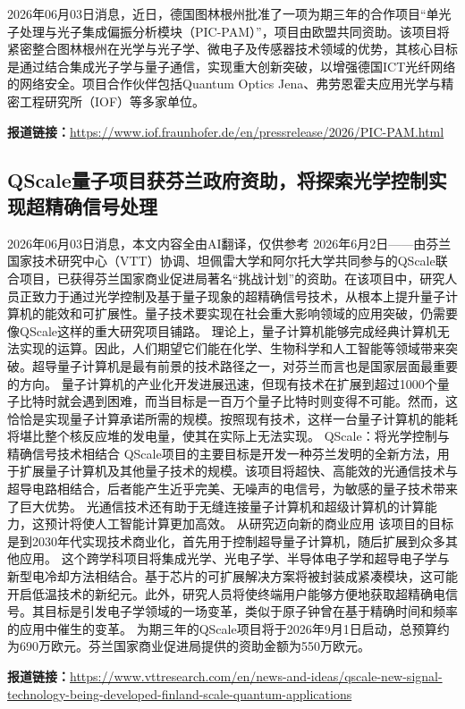 \documentclass[12pt,a4paper]{ctexart}
\begin{document}
2026年06月03日消息，近日，德国图林根州批准了一项为期三年的合作项目“单光子处理与光子集成偏振分析模块（PIC-PAM）”，项目由欧盟共同资助。该项目将紧密整合图林根州在光学与光子学、微电子及传感器技术领域的优势，其核心目标是通过结合集成光子学与量子通信，实现重大创新突破，以增强德国ICT光纤网络的网络安全。项目合作伙伴包括Quantum Optics Jena、弗劳恩霍夫应用光学与精密工程研究所（IOF）等多家单位。

\noindent\textbf{报道链接：}\url{https://www.iof.fraunhofer.de/en/pressrelease/2026/PIC-PAM.html}

\subsection{ QScale量子项目获芬兰政府资助，将探索光学控制实现超精确信号处理 }

2026年06月03日消息，本文内容全由AI翻译，仅供参考
2026年6月2日——由芬兰国家技术研究中心（VTT）协调、坦佩雷大学和阿尔托大学共同参与的QScale联合项目，已获得芬兰国家商业促进局著名“挑战计划”的资助。在该项目中，研究人员正致力于通过光学控制及基于量子现象的超精确信号技术，从根本上提升量子计算机的能效和可扩展性。量子技术要实现在社会重大影响领域的应用突破，仍需要像QScale这样的重大研究项目铺路。
理论上，量子计算机能够完成经典计算机无法实现的运算。因此，人们期望它们能在化学、生物科学和人工智能等领域带来突破。超导量子计算机是最有前景的技术路径之一，对芬兰而言也是国家层面最重要的方向。
量子计算机的产业化开发进展迅速，但现有技术在扩展到超过1000个量子比特时就会遇到困难，而当目标是一百万个量子比特时则变得不可能。然而，这恰恰是实现量子计算承诺所需的规模。按照现有技术，这样一台量子计算机的能耗将堪比整个核反应堆的发电量，使其在实际上无法实现。
QScale：将光学控制与精确信号技术相结合
QScale项目的主要目标是开发一种芬兰发明的全新方法，用于扩展量子计算机及其他量子技术的规模。该项目将超快、高能效的光通信技术与超导电路相结合，后者能产生近乎完美、无噪声的电信号，为敏感的量子技术带来了巨大优势。
光通信技术还有助于无缝连接量子计算机和超级计算机的计算能力，这预计将使人工智能计算更加高效。
从研究迈向新的商业应用
该项目的目标是到2030年代实现技术商业化，首先用于控制超导量子计算机，随后扩展到众多其他应用。
这个跨学科项目将集成光学、光电子学、半导体电子学和超导电子学与新型电冷却方法相结合。基于芯片的可扩展解决方案将被封装成紧凑模块，这可能开启低温技术的新纪元。此外，研究人员将使终端用户能够方便地获取超精确电信号。其目标是引发电子学领域的一场变革，类似于原子钟曾在基于精确时间和频率的应用中催生的变革。
为期三年的QScale项目将于2026年9月1日启动，总预算约为690万欧元。芬兰国家商业促进局提供的资助金额为550万欧元。

\noindent\textbf{报道链接：}\url{https://www.vttresearch.com/en/news-and-ideas/qscale-new-signal-technology-being-developed-finland-scale-quantum-applications}
\end{document}
